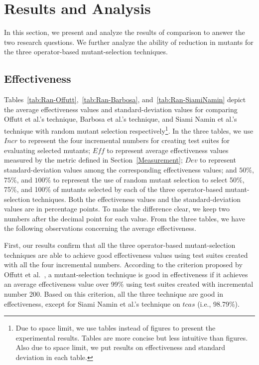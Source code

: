 \vspace{-2ex}
\section{Results and Analysis}
\label{Results}

In this section, we present and analyze the results of comparison
to answer the two research questions. We further analyze the
ability of reduction in mutants for the three operator-based
mutant-selection techniques.


\vspace{-1ex}
\subsection{Effectiveness}
\label{OffuttEff}

Tables~\ref{tab:Ran-Offutt},~\ref{tab:Ran-Barbosa},
and~\ref{tab:Ran-SiamiNamin} depict the average effectiveness
values and standard-deviation values for comparing Offutt et al.'s
technique, Barbosa et al.'s technique, and Siami Namin et al.'s
technique with random mutant selection respectively\footnote{Due
to space limit, we use tables instead of figures to present the
experimental results. Tables are more concise but less intuitive
than figures. Also due to space limit, we put results on
effectiveness and standard deviation in each table.}. In the three
tables, we use $Incr$ to represent the four incremental numbers
for creating test suites for evaluating selected mutants; $Eff$ to
represent average effectiveness values measured by the metric
defined in Section~\ref{Measurement}; $Dev$ to represent
standard-deviation values among the corresponding effectiveness
values; and $50\%$, $75\%$, and $100\%$ to represent the use of
random mutant selection to select 50\%, 75\%, and 100\% of mutants
selected by each of the three operator-based mutant-selection
techniques. Both the effectiveness values and the
standard-deviation values are in percentage points. To make the
difference clear, we keep two numbers after the decimal point for
each value. From the three tables, we have the following
observations concerning the average effectiveness.

First, our results confirm that all the three operator-based
mutant-selection techniques are able to achieve good effectiveness
values using test suites created with all the four incremental
numbers. According to the criterion proposed by Offutt et
al.~\cite{Offutt:96}, a mutant-selection technique is good in
effectiveness if it achieves an average effectiveness value over
99\% using test suites created with incremental number 200. Based
on this criterion, all the three technique are good in
effectiveness, except for Siami Namin et al.'s technique on $tcas$
(i.e., 98.79\%).

